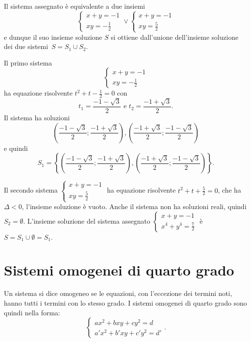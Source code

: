 \begin{exrig}
\begin{esempio}
Il sistema assegnato è equivalente a due insiemi 
\[\left\{\begin{array}{l}{x+y=-1}\\{{xy}=-\frac 1 2}\end{array}\right.\vee \left\{\begin{array}{l}{x+y=-1}\\{{xy}=\frac 5 2}\end{array}\right.\] 
e dunque il suo insieme soluzione \(S\) si ottiene dall'unione dell'insieme soluzione dei due 
sistemi~\(S=S_1\cup S_2\).

Il primo sistema 
\[\left\{\begin{array}{l}{x+y=-1}\\{{xy}=-\frac 1 2}\end{array}\right.\] 
ha equazione risolvente \(t^2+t-\frac 1 2=0\) con 
\[t_1=\frac{-1-\sqrt 3} 2\text{ e }t_2=\frac{-1+\sqrt 3} 2.\] 
Il sistema ha soluzioni 
\[\left(\frac{-1-\sqrt 3} 2;\frac{-1+\sqrt 3} 2\right),\left(\frac{-1+\sqrt 3} 2;\frac{-1-\sqrt 3} 2\right)\] e quindi \[S_1=\left\{\left(\frac{-1-\sqrt 3} 2;\frac{-1+\sqrt 3} 2\right),\left(\frac{-1+\sqrt 3} 2;\frac{-1-\sqrt 3} 2\right)\right\}.\]

Il secondo sistema \(\left\{\begin{array}{l}{x+y=-1}\\{{xy}=\frac 5 2}\end{array}\right.\) ha equazione risolvente \(t^2+t+\frac 5 2=0\), che ha \(\Delta <0\), l'insieme soluzione è vuoto. Anche il sistema non ha soluzioni reali, quindi \(S_2=\emptyset \). L'insieme soluzione del sistema assegnato \(\left\{\begin{array}{l}{x+y=-1}\\{x^4+y^4=\frac 7 2}\end{array}\right.\) è \(S=S_1\cup \emptyset =S_1\).
\end{esempio}
\end{exrig}
\ovalbox{\risolvii \ref{ese:6.26}, \ref{ese:6.27}, \ref{ese:6.28}, \ref{ese:6.29}, \ref{ese:6.30}, \ref{ese:6.31}, \ref{ese:6.32}, \ref{ese:6.33}, \ref{ese:6.34}, \ref{ese:6.35}}

\section{Sistemi omogenei di quarto grado}
Un sistema si dice omogeneo se le equazioni, con l'eccezione dei termini noti, hanno tutti i termini con lo stesso grado. I sistemi omogenei di quarto grado sono quindi nella forma:
\begin{equation*}
\left\{\begin{array}{l}{{ax}^2+{bxy}+{cy}^2=d}\\{a'x^2+b'{xy}+c'y^2=d'}\end{array}\right..
\end{equation*}
